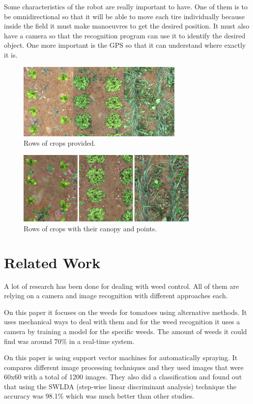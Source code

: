 \documentclass[journal]{IEEEtran}
\begin{document}
Some characteristics of the robot are really important to have. One of them is to be omnidirectional so that it will be able to move each tire individually because inside the field it must make manoeuvres to get the desired position. It must also have a camera so that the recognition program can use it to identify the desired object. One more important is the GPS so that it can understand where exactly it is.

\begin{figure}[ht]
\centering
\includegraphics[width=3.2in]{originalplants}
\caption{Rows of crops provided.}
\label{orig_plants}
\end{figure}

\begin{figure}[ht]
\centering
\includegraphics[width=3.5in]{processedplants}
\caption{Rows of crops with their canopy and points.}
\label{proc_plants}
\end{figure}



\section{Related Work}
A lot of research has been done for dealing with weed control. All of them are relying on a camera and image recognition with different approaches each.

On this paper \cite{weed_control2} it focuses on the weeds for tomatoes using alternative methods. It uses mechanical ways to deal with them and for the weed recognition it uses a camera by training a model for the specific weeds. The amount of weeds it could find was around 70\% in a real-time system.

On this paper \cite{weed_control3} is using support vector machines for automatically spraying. It compares different image processing techniques and they used images that were 60x60 with a total of 1200 images. They also did a classification and found out that using the SWLDA (step-wise  linear  discriminant  analysis) technique the accuracy was 98.1\% which was much better than other studies.
\end{document}
